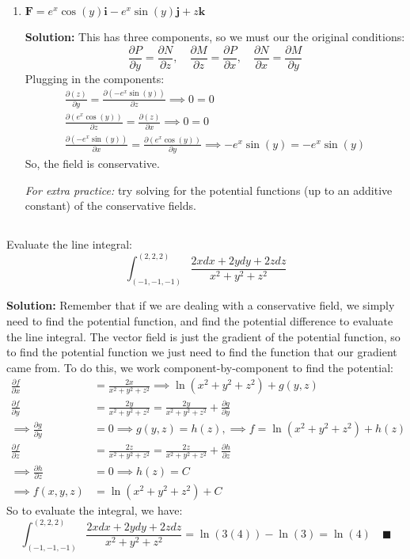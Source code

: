 \documentclass[letterpaper, 11pt]{article}
\begin{document}
\begin{enumerate}[label=(\alph*)]
\item $\bm{F} = e^x\cos(y)\bm{i} - e^x\sin(y)\bm{j} + z\bm{k}$
\par \textbf{Solution:} This has three components, so we must our the original conditions:
\[\frac{ \partial P}{\partial y} = \frac{ \partial N}{\partial z}, \quad \frac{ \partial M}{\partial z} = \frac{ \partial P}{\partial x}, \quad \frac{ \partial N}{\partial x} = \frac{ \partial M}{\partial y}\]
Plugging in the components:
\begin{gather*}
\frac{ \partial (z)}{\partial y} = \frac{ \partial (- e^x\sin(y))}{\partial z} \implies  0 = 0 \\
\frac{ \partial (e^x\cos(y))}{\partial z} = \frac{ \partial (z)}{\partial x} \implies 0 = 0\\
 \frac{ \partial (- e^x\sin(y))}{\partial x} = \frac{ \partial (e^x\cos(y))}{\partial y} \implies - e^x\sin(y) = - e^x \sin(y) 
\end{gather*}
So, the field is conservative. 
\par \textit{For extra practice:} try solving for the potential functions (up to an additive constant) of the conservative fields. 

\end{enumerate} 

\subsection{} Evaluate the line integral:
\[ \int_{(-1,-1,-1)}^{(2,2,2)} \frac{2x dx + 2y dy + 2z dz}{x^2 + y^2 + z^2} \]
\par \textbf{Solution:} Remember that if we are dealing with a conservative field, we simply need to find the potential function, and find the potential difference to evaluate the line integral. The vector field is just the gradient of the potential function, so to find the potential function we just need to find the function that our gradient came from. To do this, we work component-by-component to find the potential:
\begin{align*}
\frac{\partial f}{\partial x} &= \frac{2x}{x^2 + y^2 + z^2} \implies \ln(x^2 + y^2 + z^2) + g(y,z)\\
\frac{\partial f}{\partial y} &= \frac{2y}{x^2 + y^2 + z^2} = \frac{2y}{x^2 + y^2 + z^2}  + \frac{\partial g}{\partial y} \\
\implies \frac{\partial g}{\partial y} &= 0 \implies g(y,z) = h(z), \implies  f =\ln(x^2 + y^2 + z^2)  + h(z) \\
\frac{\partial f}{\partial z} &= \frac{2z}{x^2 + y^2 + z^2} = \frac{2z}{x^2 + y^2 + z^2} + \frac{\partial h}{\partial z} \\
\implies \frac{\partial h}{\partial z} &= 0 \implies h(z) = C \\
\implies f(x,y,z) &= \ln(x^2 + y^2 + z^2) + C
\end{align*}
So to evaluate the integral, we have:
\[  \int_{(-1,-1,-1)}^{(2,2,2)} \frac{2x dx + 2y dy + 2z dz}{x^2 + y^2 + z^2} = \ln(3(4)) - \ln(3) = \ln(4) \quad\blacksquare \]
\end{document}
